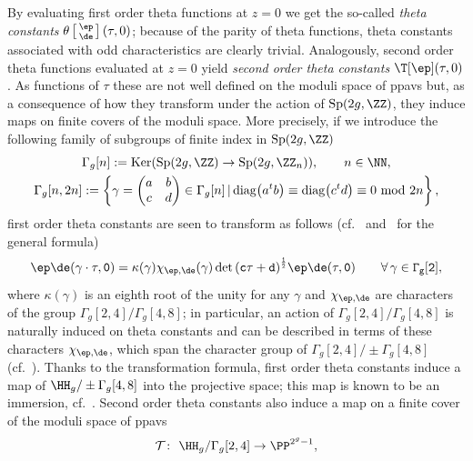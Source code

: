 By evaluating first order theta functions at $z=0$ we get the so-called {\it theta constants} $\theta\left[\begin{smallmatrix}\ep \\ \de \end{smallmatrix}\right] (\tau,0)$; because of the parity of theta functions, theta constants associated with odd characteristics are clearly trivial. Analogously, second order theta functions evaluated at $z=0$ yield {\it second order theta constants} $\T[\ep](\tau,0)$. As functions of $\tau$ these are not well defined on the moduli space of ppavs but, as a consequence of how they transform under the action of ${\rm Sp}(2g, \ZZ)$, they induce maps on finite covers of the moduli space. More precisely, if we introduce the following family of subgroups of finite index in ${\rm Sp}(2g, \ZZ)$
\begin{gather*}
\Gamma_g[n]:= \operatorname{Ker}({\rm Sp}(2g,\ZZ) \to {\rm Sp}(2g,\ZZ_n)), \qquad n \in \NN,\\
\Gamma_g[n,2n]:=\left\lbrace\gamma = \begin{pmatrix} a & b \\ c & d \end{pmatrix} \in \Gamma_g[n] \,|\, {\rm diag}\big(a^tb\big)\equiv{\rm diag}
\big(c^td\big)\equiv0\ {\rm mod}\ 2n \right\rbrace,
\end{gather*}
first order theta constants are seen to transform as follows (cf.~\cite{Ig72} and~\cite{RF} for the general formula)
\[
\tt\ep\de(\gamma \cdot \tau,0) = \kappa(\gamma) \chi_{\ep,\de}(\gamma) \det{(c \tau + d)}^{\frac{1}{2}} \tt\ep\de(\tau,0) \qquad \forall\, \gamma \in \Gamma_g[2],
\]
where $\kappa(\gamma)$ is an eighth root of the unity for any $\gamma$ and $ \chi_{\ep,\de}$ are characters of the group $\Gamma_g[2,4]/\Gamma_g[4,8]$; in particular, an action of $\Gamma_g[2,4]/\Gamma_g[4,8]$ is naturally induced on theta constants and can be described in terms of these characters $ \chi_{\ep,\de}$, which span the character group of $\Gamma_g[2,4]/\pm\Gamma_g[4,8]$ (cf.~\cite{SM}). Thanks to the transformation formula, first order theta constants induce a map of $\HH_g/\pm\Gamma_g[4,8]$ into the projective space; this map is known to be an immersion, cf.~\cite{Ig72}. Second order theta constants also induce a map on a finite cover of the moduli space of ppavs
\[
\mathcal{T}\colon \ \HH_g /\Gamma_g[2,4] \to \PP^{2^g-1},
\]
